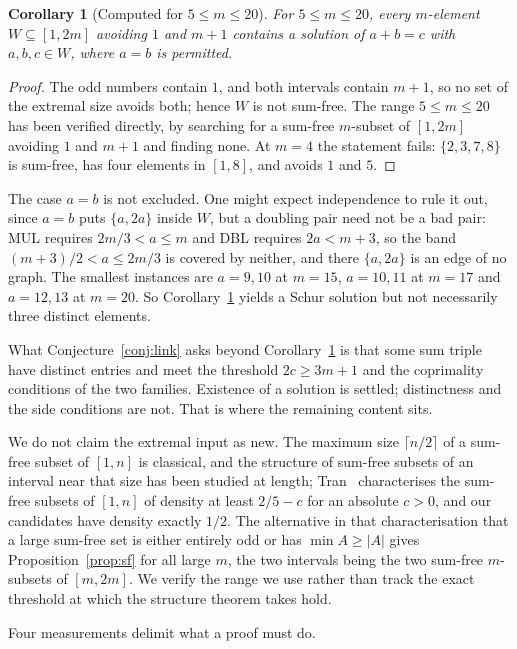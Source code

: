 \documentclass[11pt]{amsart}
\theoremstyle{plain}
\newtheorem{corollary}[theorem]{Corollary}
\theoremstyle{definition}
\begin{document}
\begin{corollary}[Computed for $5\le m\le20$]\label{cor:schur}
For $5\le m\le20$, every $m$-element $W\subseteq[1,2m]$ avoiding $1$ and $m+1$ contains a solution of
$a+b=c$ with $a,b,c\in W$, where $a=b$ is permitted.
\end{corollary}

\begin{proof}
The odd numbers contain $1$, and both intervals contain $m+1$, so no set of the extremal size avoids
both; hence $W$ is not sum-free. The range $5\le m\le20$ has been verified directly, by searching for
a sum-free $m$-subset of $[1,2m]$ avoiding $1$ and $m+1$ and finding none. At $m=4$ the statement
fails: $\{2,3,7,8\}$ is sum-free, has four elements in $[1,8]$, and avoids $1$ and $5$.
\end{proof}

The case $a=b$ is not excluded. One might expect independence to rule it out, since $a=b$ puts
$\{a,2a\}$ inside $W$, but a doubling pair need not be a bad pair: MUL requires $2m/3<a\le m$ and
DBL requires $2a<m+3$, so the band $(m+3)/2<a\le2m/3$ is covered by neither, and there $\{a,2a\}$ is
an edge of no graph. The smallest instances are $a=9,10$ at $m=15$, $a=10,11$ at $m=17$ and
$a=12,13$ at $m=20$. So Corollary~\ref{cor:schur} yields a Schur solution but not necessarily three
distinct elements.

What Conjecture~\ref{conj:link} asks beyond Corollary~\ref{cor:schur} is that some sum triple have
distinct entries and meet the threshold $2c\ge3m+1$ and the coprimality conditions of the two
families. Existence of a solution is settled; distinctness and the side conditions are not. That is
where the remaining content sits.

We do not claim the extremal input as new. The maximum size $\lceil n/2\rceil$ of a sum-free subset
of $[1,n]$ is classical, and the structure of sum-free subsets of an interval near that size has been
studied at length; Tran~\cite{Tran} characterises the sum-free subsets of $[1,n]$ of density at
least $2/5-c$ for an absolute $c>0$, and our candidates have density exactly $1/2$. The alternative
in that characterisation that a large sum-free set is either entirely odd or has $\min A\ge|A|$
gives Proposition~\ref{prop:sf} for all large $m$, the two intervals being the two sum-free
$m$-subsets of $[m,2m]$. We verify the range we use rather than
track the exact threshold at which the structure theorem takes hold.

Four measurements delimit what a proof must do.
\end{document}
